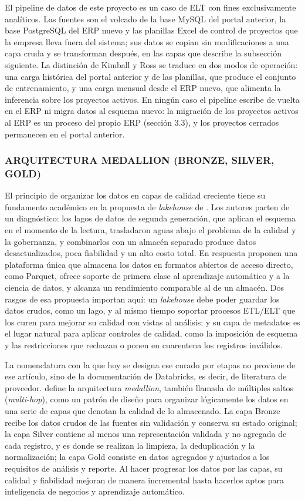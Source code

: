 El pipeline de datos de este proyecto es un caso de ELT con fines exclusivamente analíticos. Las fuentes son el volcado de la base MySQL del portal anterior, la base PostgreSQL del ERP nuevo y las planillas Excel de control de proyectos que la empresa lleva fuera del sistema; sus datos se copian sin modificaciones a una capa cruda y se transforman después, en las capas que describe la subsección siguiente. La distinción de Kimball y Ross se traduce en dos modos de operación: una carga histórica del portal anterior y de las planillas, que produce el conjunto de entrenamiento, y una carga mensual desde el ERP nuevo, que alimenta la inferencia sobre los proyectos activos. En ningún caso el pipeline escribe de vuelta en el ERP ni migra datos al esquema nuevo: la migración de los proyectos activos al ERP es un proceso del propio ERP (sección 3.3), y los proyectos cerrados permanecen en el portal anterior.

\subsubsection{ARQUITECTURA MEDALLION (BRONZE, SILVER, GOLD)}

El principio de organizar los datos en capas de calidad creciente tiene su fundamento académico en la propuesta de \textit{lakehouse} de \textcite{Armbrust2021}. Los autores parten de un diagnóstico: los lagos de datos de segunda generación, que aplican el esquema en el momento de la lectura, trasladaron aguas abajo el problema de la calidad y la gobernanza, y combinarlos con un almacén separado produce datos desactualizados, poca fiabilidad y un alto costo total. En respuesta proponen una plataforma única que almacena los datos en formatos abiertos de acceso directo, como Parquet, ofrece soporte de primera clase al aprendizaje automático y a la ciencia de datos, y alcanza un rendimiento comparable al de un almacén. Dos rasgos de esa propuesta importan aquí: un \textit{lakehouse} debe poder guardar los datos crudos, como un lago, y al mismo tiempo soportar procesos ETL/ELT que los curen para mejorar su calidad con vistas al análisis; y su capa de metadatos es el lugar natural para aplicar controles de calidad, como la imposición de esquema y las restricciones que rechazan o ponen en cuarentena los registros inválidos.

La nomenclatura con la que hoy se designa ese curado por etapas no proviene de ese artículo, sino de la documentación de Databricks, es decir, de literatura de proveedor. \textcite{DatabricksMedallion} define la arquitectura \textit{medallion}, también llamada de múltiples saltos (\textit{multi-hop}), como un patrón de diseño para organizar lógicamente los datos en una serie de capas que denotan la calidad de lo almacenado. La capa Bronze recibe los datos crudos de las fuentes sin validación y conserva su estado original; la capa Silver contiene al menos una representación validada y no agregada de cada registro, y es donde se realizan la limpieza, la deduplicación y la normalización; la capa Gold consiste en datos agregados y ajustados a los requisitos de análisis y reporte. Al hacer progresar los datos por las capas, su calidad y fiabilidad mejoran de manera incremental hasta hacerlos aptos para inteligencia de negocios y aprendizaje automático.

